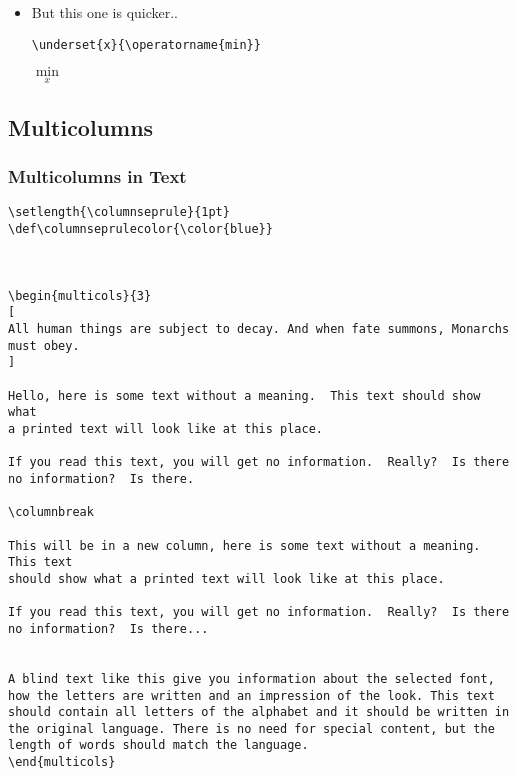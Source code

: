 \begin{itemize}
\begin{lstlisting}[language = Tex, numbers = none]
        \begin{equation}
            \hat{\bb{S}} = \operatorname*{argmin}_\bb{S} \left\Vert\bb{X} - \bb{A}\bb{S}\right\Vert^2_F
        \end{equation}
    \end{lstlisting}
    \begin{equation}
        \hat{\bb{S}} = \operatorname*{argmin}_\bb{S} \left\Vert\bb{X} - \bb{A}\bb{S}\right\Vert^2_F
    \end{equation}
    \item But this one is quicker..
    \begin{lstlisting}[language=Tex, numbers=none]
        \underset{x}{\operatorname{min}} 
    \end{lstlisting}
    $\underset{x}{\operatorname{min}} $
\end{itemize}






\subsection{Multicolumns}

\subsubsection{Multicolumns in Text}

\begin{lstlisting}[language=Tex]
\setlength{\columnseprule}{1pt}
\def\columnseprulecolor{\color{blue}}
 

 
\begin{multicols}{3}
[
All human things are subject to decay. And when fate summons, Monarchs must obey.
]
 
Hello, here is some text without a meaning.  This text should show what 
a printed text will look like at this place.
 
If you read this text, you will get no information.  Really?  Is there 
no information?  Is there.
 
\columnbreak
 
This will be in a new column, here is some text without a meaning.  This text 
should show what a printed text will look like at this place.
 
If you read this text, you will get no information.  Really?  Is there 
no information?  Is there...


A blind text like this give you information about the selected font, how the letters are written and an impression of the look. This text should contain all letters of the alphabet and it should be written in the original language. There is no need for special content, but the length of words should match the language.
\end{multicols}
\end{lstlisting}

